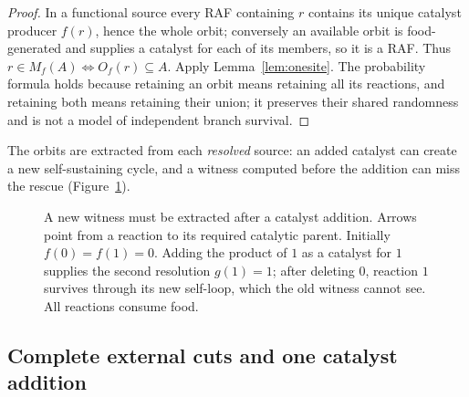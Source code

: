 \documentclass[11pt,a4paper]{article}
\theoremstyle{plain}
\theoremstyle{definition}
\theoremstyle{remark}
\begin{document}
\begin{proof}
In a functional source every RAF containing $r$ contains its unique catalyst producer $f(r)$, hence the whole orbit; conversely an available orbit is food-generated and supplies a catalyst for each of its members, so it is a RAF. Thus $r\in M_f(A)\iff O_f(r)\subseteq A$. Apply Lemma~\ref{lem:onesite}. The probability formula holds because retaining an orbit means retaining all its reactions, and retaining both means retaining their union; it preserves their shared randomness and is not a model of independent branch survival.
\end{proof}

The orbits are extracted from each \emph{resolved} source: an added catalyst can create a new self-sustaining cycle, and a witness computed before the addition can miss the rescue (Figure~\ref{fig:newcycle}).

\begin{figure}[t]
\centering
{}
\caption{A new witness must be extracted after a catalyst addition. Arrows point from a reaction to its required catalytic parent. Initially $f(0)=f(1)=0$. Adding the product of $1$ as a catalyst for $1$ supplies the second resolution $g(1)=1$; after deleting $0$, reaction $1$ survives through its new self-loop, which the old witness cannot see. All reactions consume food.}
\label{fig:newcycle}
\end{figure}

\subsection{Complete external cuts and one catalyst addition}
\end{document}
